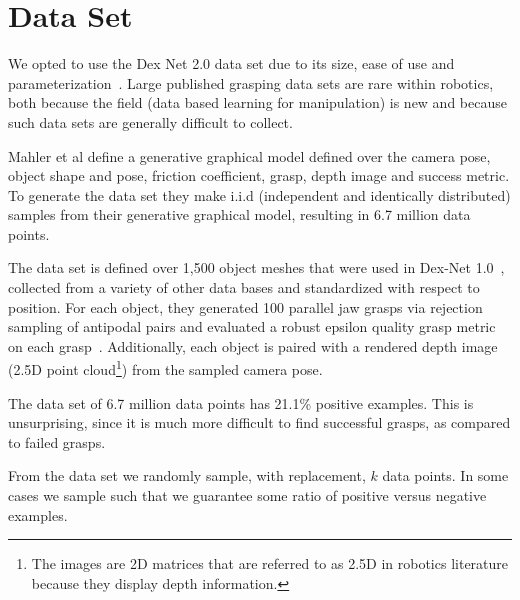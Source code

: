 
\section{Data Set}
\label{sec:data_set}

We opted to use the Dex Net 2.0 data set due to its size, ease of use and parameterization~\cite{mahler2017dex}. 
Large published grasping data sets are rare within robotics, both because the field (data based learning for manipulation) is new and because such data sets are generally difficult to collect. 

Mahler et al define a generative graphical model defined over the camera pose, object shape and pose, friction coefficient, grasp, depth image and success metric. 
To generate the data set they make i.i.d (independent and identically distributed) samples from their generative graphical model, resulting in 6.7 million data points. 

The data set is defined over 1,500 object meshes that were used in Dex-Net 1.0~\cite{mahler2016dex}, collected from a variety of other data bases and standardized with respect to position.
For each object, they generated 100 parallel jaw grasps via rejection sampling of antipodal pairs and evaluated a robust epsilon quality grasp metric on each grasp~\cite{seita2016large}. 
Additionally, each object is paired with a rendered depth image (2.5D point cloud\footnote{The images are 2D matrices that are referred to as 2.5D in robotics literature because they display depth information.}) from the sampled camera pose. 

The data set of 6.7 million data points has 21.1\% positive examples. 
This is unsurprising, since it is much more difficult to find successful grasps, as compared to failed grasps. 

From the data set we randomly sample, with replacement, $k$ data points. 
In some cases we sample such that we guarantee some ratio of positive versus negative examples. 